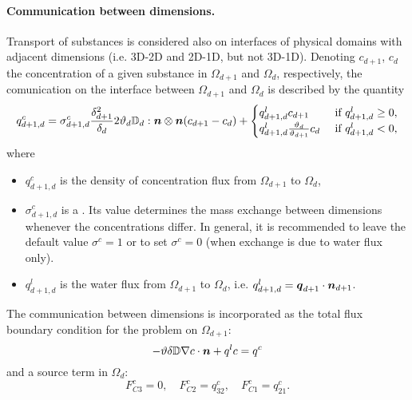 \paragraph{Communication between dimensions.}
Transport of substances is considered also on interfaces of physical domains with adjacent dimensions (i.e. 3D-2D and 2D-1D, but not 3D-1D).
Denoting $c_{d+1}$, $c_d$ the concentration of a given substance in $\Omega_{d+1}$ and $\Omega_d$, respectively, the comunication on the interface between $\Omega_{d+1}$ and $\Omega_d$ is described by the quantity
\begin{equation}
  \label{e:inter_dim_flux}
  q^c_{d+1,d} = \sigma^c_{d+1,d} \frac{\delta_{d+1}^2}{\delta_d}2\th_d\D_d:\n\otimes\n ( c_{d+1} - c_d) + \begin{cases}q^l_{d+1,d} c_{d+1} & \mbox{ if }q^l_{d+1,d}\ge 0,\\q^l_{d+1,d} \frac{\th_d}{\th_{d+1}} c_d & \mbox{ if }q^l_{d+1,d}<0,\end{cases}
\end{equation}
where
\begin{itemize}
\item $q^c_{d+1,d}$  is the density of concentration flux from $\Omega_{d+1}$ to $\Omega_d$,
\item $\sigma^c_{d+1,d}$ \units{}{}{} is a .
Its value determines the mass exchange between dimensions whenever the concentrations differ.
In general, it is recommended to leave the default value $\sigma^c=1$ or to set $\sigma^c=0$ (when exchange is due to water flux only).
\item $q^l_{d+1,d}$  is the water flux from $\Omega_{d+1}$ to $\Omega_d$, i.e. $q^l_{d+1,d} = \mathbf{\boldsymbol{q}}_{d+1}\cdot\mathbf{\boldsymbol{n}}_{d+1}$.
\end{itemize}
The communication between dimensions is incorporated as the total flux boundary condition for the problem on $\Omega_{d+1}$:
\begin{equation}
\label{e:FC}
-\th\delta\D\nabla c\cdot\vc n + q^l c = q^c
\end{equation}
and a source term in $\Omega_d$:
\begin{equation}
F^c_{C3} = 0,\quad
F^c_{C2} = q^c_{32},\quad
F^c_{C1} = q^c_{21}.
\end{equation}


